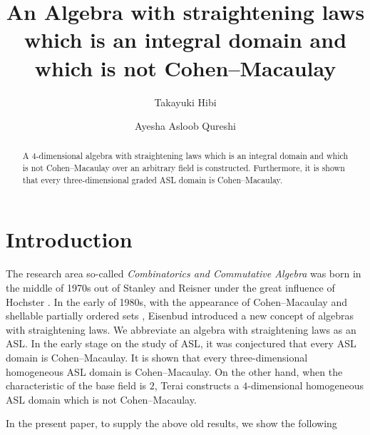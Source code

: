 \documentclass[12pt]{amsart}
\begin{document}
\title[Algebras with straightening laws]{An Algebra with straightening laws which is an integral domain and which is not Cohen--Macaulay}

\author[T.~Hibi]{Takayuki Hibi}
\author[A. A. Qureshi]{Ayesha Asloob Qureshi}
\address{(Takayuki Hibi) Department of Pure and Applied Mathematics, Graduate School of Information Science and Technology, The University of Osaka, Suita, Osaka 565--0871, Japan}
\address{(Ayesha Asloob Qureshi) Faculty of Engineering and Natural Sciences, Sabanci University, Orta Mahalle, Tuzla 34956, Istanbul, Turkey}	



\begin{abstract}
A $4$-dimensional algebra with straightening laws which is an integral domain and which is not Cohen--Macaulay over an arbitrary field is constructed.  Furthermore, it is shown that every three-dimensional graded ASL domain is Cohen--Macaulay. 
\end{abstract}	
\maketitle
\thispagestyle{empty}



\section*{Introduction}
The research area so-called {\em Combinatorics and Commutative Algebra} was born in the middle of 1970s out of Stanley \cite{UBC} and Reisner \cite{Rei} under the great influence of Hochster \cite{Hoc}.  In the early of 1980s, with the appearance of Cohen--Macaulay and shellable partially ordered sets \cite{Bac, Bjo}, Eisenbud \cite{Eis} introduced a new concept of algebras with straightening laws.  We abbreviate an algebra with straightening laws as an ASL.  In the early stage on the study of ASL, it was conjectured that every ASL domain is Cohen--Macaulay.  It is shown \cite[Corollary, p.~32]{HW1} that every three-dimensional homogeneous ASL domain is Cohen--Macaulay.  On the other hand, when the characteristic of the base field is $2$, Terai \cite{Terai} constructs a $4$-dimensional homogeneous ASL domain which is not Cohen--Macaulay.  

In the present paper, to supply the above old results, we show the following
\end{document}
